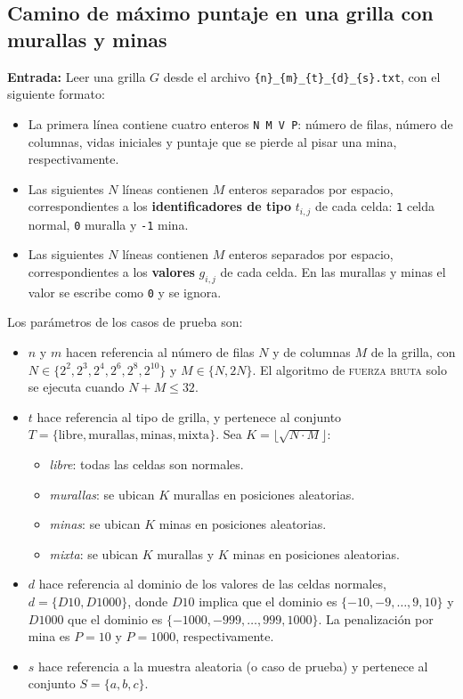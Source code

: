 
\subsection{Camino de máximo puntaje en una grilla con murallas y minas}

\textbf{Entrada:} Leer una grilla $G$ desde el archivo \verb|{n}_{m}_{t}_{d}_{s}.txt|, con el siguiente formato:
\begin{itemize}
  \item La primera línea contiene cuatro enteros \texttt{N M V P}: número de filas, número de columnas, vidas iniciales y puntaje que se pierde al pisar una mina, respectivamente.
  \item Las siguientes $N$ líneas contienen $M$ enteros separados por espacio, correspondientes a los \textbf{identificadores de tipo} $t_{i,j}$ de cada celda: \texttt{1} celda normal, \texttt{0} muralla y \texttt{-1} mina.
  \item Las siguientes $N$ líneas contienen $M$ enteros separados por espacio, correspondientes a los \textbf{valores} $g_{i,j}$ de cada celda. En las murallas y minas el valor se escribe como \texttt{0} y se ignora.
\end{itemize}

Los parámetros de los casos de prueba son:
\begin{itemize}
  \item $n$ y $m$ hacen referencia al número de filas $N$ y de columnas $M$ de la grilla, con $N \in \{2^2, 2^3, 2^4, 2^6, 2^8, 2^{10}\}$ y $M \in \{N, 2N\}$. El algoritmo de \textsc{fuerza bruta} solo se ejecuta cuando $N + M \leq 32$.
  \item $t$ hace referencia al tipo de grilla, y pertenece al conjunto $T = \{\text{libre}, \text{murallas}, \text{minas}, \text{mixta}\}$. Sea $K = \lfloor \sqrt{N \cdot M} \rfloor$:
  \begin{itemize}
    \item \emph{libre}: todas las celdas son normales.
    \item \emph{murallas}: se ubican $K$ murallas en posiciones aleatorias.
    \item \emph{minas}: se ubican $K$ minas en posiciones aleatorias.
    \item \emph{mixta}: se ubican $K$ murallas y $K$ minas en posiciones aleatorias.
  \end{itemize}
  \item $d$ hace referencia al dominio de los valores de las celdas normales, $d = \{D10, D1000\}$, donde $D10$ implica que el dominio es $\{-10, -9, \dots, 9, 10\}$ y $D1000$ que el dominio es $\{-1000, -999, \dots, 999, 1000\}$. La penalización por mina es $P = 10$ y $P = 1000$, respectivamente.
  \item $s$ hace referencia a la muestra aleatoria (o caso de prueba) y pertenece al conjunto $S = \{a, b, c\}$.
\end{itemize}


